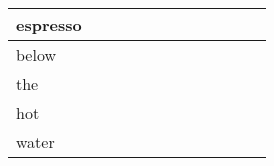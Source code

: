 \documentclass[landscape]{article}
\newcommand{\ssp}{\hspace{2pt}}
\begin{document}
\begin{tabular}{|l|p{10pt}|p{10pt}|p{10pt}|p{10pt}|p{10pt}|p{10pt}|p{10pt}|p{10pt}|p{10pt}|p{10pt}|p{10pt}|}
\hline
\ssp espresso \ssp&\hspace{2pt}&\hspace{2pt}&\hspace{2pt}&\hspace{2pt}&\hspace{2pt}&\hspace{2pt}&\hspace{2pt}&\hspace{2pt}&\hspace{2pt}&\hspace{2pt}&\hspace{2pt}\\
\hline
\ssp below \ssp&\hspace{2pt}&\hspace{2pt}&\hspace{2pt}&\hspace{2pt}&\hspace{2pt}&\hspace{2pt}&\hspace{2pt}&\hspace{2pt}&\hspace{2pt}&\hspace{2pt}&\hspace{2pt}\\
\hline
\ssp the \ssp&\hspace{2pt}&\hspace{2pt}&\hspace{2pt}&\hspace{2pt}&\hspace{2pt}&\hspace{2pt}&\hspace{2pt}&\hspace{2pt}&\hspace{2pt}&\hspace{2pt}&\hspace{2pt}\\
\hline
\ssp hot \ssp&\hspace{2pt}&\hspace{2pt}&\hspace{2pt}&\hspace{2pt}&\hspace{2pt}&\hspace{2pt}&\hspace{2pt}&\hspace{2pt}&\hspace{2pt}&\hspace{2pt}&\hspace{2pt}\\
\hline
\ssp water \ssp&\hspace{2pt}&\hspace{2pt}&\hspace{2pt}&\hspace{2pt}&\hspace{2pt}&\hspace{2pt}&\hspace{2pt}&\hspace{2pt}&\hspace{2pt}&\hspace{2pt}&\hspace{2pt}\\

\end{tabular}
\end{document}
